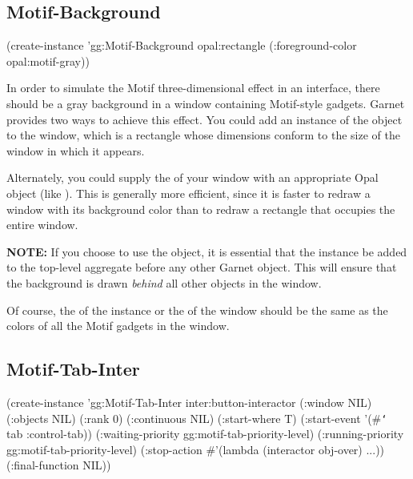 \subsection{Motif-Background}

\begin{programexample}
(create-instance 'gg:Motif-Background opal:rectangle
   (:foreground-color opal:motif-gray))
\end{programexample}

In order to simulate the Motif three-dimensional effect in an interface,
there should be a gray background in a window containing Motif-style
gadgets.  Garnet provides two ways to achieve this effect.  You could
add an instance of the  object to the window,
which is a rectangle whose dimensions conform to the size of the
window in which it appears.

Alternately, you could supply the  of your window
with an appropriate Opal  object (like
).  This is generally more efficient, since it is
faster to redraw a window with its background color than to redraw a
rectangle that occupies the entire window.

{\bf NOTE:} If you choose to use the  object, it is
essential that the instance be added to the top-level aggregate before
any other Garnet object.  This will ensure that the background is
drawn {\it behind} all other objects in the window.

Of course, the  of the 
instance or the  of the window
should be the same as the colors of all the Motif gadgets in the window.

\begin{group}
\subsection{Motif-Tab-Inter}

\begin{programexample}
(create-instance 'gg:Motif-Tab-Inter inter:button-interactor
   (:window NIL)
   (:objects NIL)
   (:rank 0)
   (:continuous NIL)
   (:start-where T)
   (:start-event '(\#{\tt\char`\\}tab :control-tab))
   (:waiting-priority gg:motif-tab-priority-level)
   (:running-priority gg:motif-tab-priority-level)
   (:stop-action \#'(lambda (interactor obj-over) ...))
   (:final-function NIL))
\end{programexample}
\end{group}

